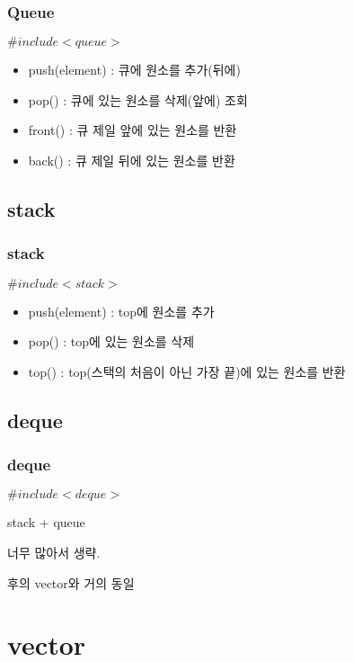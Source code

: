 \documentclass[10pt]{beamer}
\begin{document}
\begin{frame}
    \frametitle{Queue}
    $\#include<queue>$
    \begin{itemize}
        \item push(element) : 큐에 원소를 추가(뒤에)
        \item pop() : 큐에 있는 원소를 삭제(앞에) 조회
        \item front() : 큐 제일 앞에 있는 원소를 반환
        \item back() : 큐 제일 뒤에 있는 원소를 반환
    \end{itemize}
\end{frame}



\subsection{stack}


\begin{frame}
    \frametitle{stack}
    $\#include<stack>$
    \begin{itemize}
        \item push(element) : top에 원소를 추가
        \item pop() : top에 있는 원소를 삭제
        \item top() : top(스택의 처음이 아닌 가장 끝)에 있는 원소를 반환
    \end{itemize}
\end{frame}


\subsection{deque}

\begin{frame}
    \frametitle{deque}

    $\#include<deque>$
    
    stack  + queue
    
    너무 많아서 생략.

    후의 vector와 거의 동일
\end{frame}




\section{vector}
\end{document}
